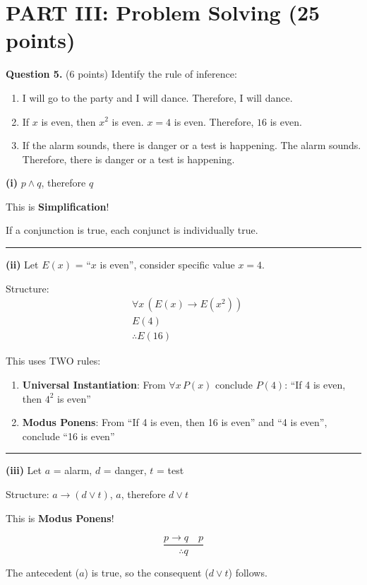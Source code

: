 \documentclass[11pt,a4paper]{article}
\begin{document}
\section*{PART III: Problem Solving (25 points)}

\textbf{Question 5.} (6 points) Identify the rule of inference:

\begin{enumerate}[label=(\roman*)]
    \item I will go to the party and I will dance. Therefore, I will dance.
    \item If $x$ is even, then $x^2$ is even. $x = 4$ is even. Therefore, $16$ is even.
    \item If the alarm sounds, there is danger or a test is happening. The alarm sounds. Therefore, there is danger or a test is happening.
\end{enumerate}

\begin{solnbox}
\textbf{(i)} $p \land q$, therefore $q$

This is \textbf{Simplification}!

If a conjunction is true, each conjunct is individually true.

\rule{\linewidth}{0.3pt}

\textbf{(ii)} Let $E(x)$ = ``$x$ is even'', consider specific value $x = 4$.

Structure:
\begin{align*}
&\forall x\, (E(x) \to E(x^2)) \\
&E(4) \\
&\therefore E(16)
\end{align*}

This uses TWO rules:
\begin{enumerate}[noitemsep]
    \item \textbf{Universal Instantiation}: From $\forall x\, P(x)$ conclude $P(4)$: ``If 4 is even, then $4^2$ is even''
    \item \textbf{Modus Ponens}: From ``If 4 is even, then 16 is even'' and ``4 is even'', conclude ``16 is even''
\end{enumerate}

\rule{\linewidth}{0.3pt}

\textbf{(iii)} Let $a$ = alarm, $d$ = danger, $t$ = test

Structure: $a \to (d \lor t)$, $a$, therefore $d \lor t$

This is \textbf{Modus Ponens}!

$$\frac{p \to q \quad p}{\therefore q}$$

The antecedent ($a$) is true, so the consequent ($d \lor t$) follows.
\end{solnbox}
\end{document}
